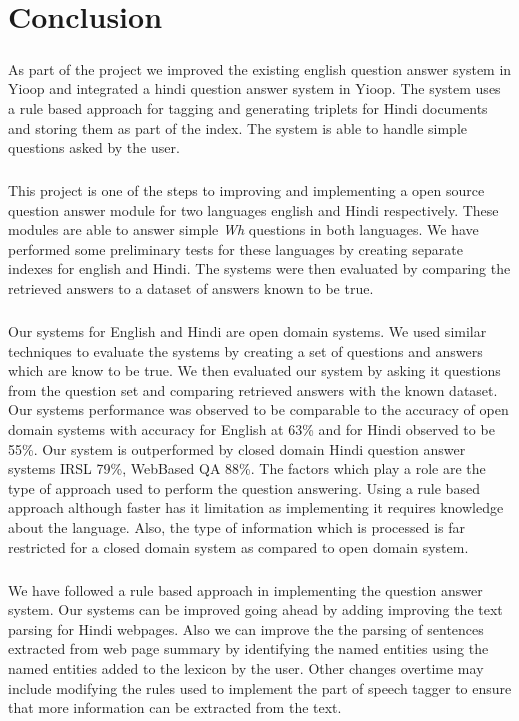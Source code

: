 \chapter{Conclusion}

\paragraph{}
As part of the project we improved the existing english question answer system in Yioop and integrated a hindi question answer system in Yioop. The system uses a rule based approach for tagging and generating triplets for Hindi documents and storing them as part of the index. The system is able to handle simple questions asked by the user.

\paragraph{}
This project is one of the steps to improving and implementing a open source question answer module for two languages english and Hindi respectively. These modules are able to answer simple \textit{Wh} questions in both languages. We have performed some preliminary tests for these languages by creating separate indexes for english and Hindi. The systems were then evaluated by comparing the retrieved answers to a dataset of answers known to be true.

\paragraph{}
Our systems for English and Hindi are open domain systems. We used similar techniques to evaluate the systems by creating a set of questions and answers which are know to be true. We then evaluated our system by asking it questions from the question set and comparing retrieved answers with the known dataset. Our systems performance was observed to be comparable to the accuracy of open domain systems with accuracy for English at 63\% and for Hindi observed to be 55\%. Our system is outperformed by closed domain Hindi question answer systems IRSL 79\%, WebBased QA 
\cite{nanda2016hindi} 88\%. The factors which play a role are the type of approach used to perform the question answering. Using a rule based approach although faster has it limitation as implementing it requires knowledge about the language. Also, the type of information which is processed is far restricted for a  closed domain system as compared to open domain system.

\paragraph{}
We have followed a rule based approach in implementing the question answer system. Our systems can be improved going ahead by adding improving the text parsing for Hindi webpages. Also we can improve the the parsing of sentences extracted from web page summary by identifying the named entities using  the named entities added to the lexicon by the user. Other changes overtime may include modifying the rules used to implement the part of speech tagger to ensure that more information can be extracted from the text.